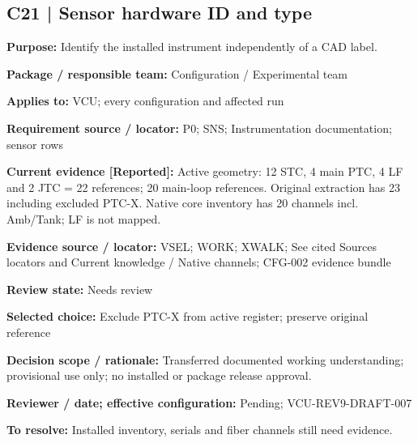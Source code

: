 \documentclass[11pt]{article}
\begin{document}
\par\noindent\begin{minipage}{\textwidth}\small\setlength{\parskip}{2pt}
\subsection*{C21 | Sensor hardware ID and type}
\textbf{Purpose:} Identify the installed instrument independently of a CAD label.\par
\textbf{Package / responsible team:} Configuration / Experimental team\par
\textbf{Applies to:} VCU; every configuration and affected run\par
\textbf{Requirement source / locator:} P0; SNS; Instrumentation documentation; sensor rows\par
\textbf{Current evidence [Reported]:} Active geometry: 12 STC, 4 main PTC, 4 LF and 2 JTC = 22 references; 20 main-loop references. Original extraction has 23 including excluded PTC-X. Native core inventory has 20 channels incl. Amb/Tank; LF is not mapped.\par
\textbf{Evidence source / locator:} VSEL; WORK; XWALK; See cited Sources locators and Current knowledge / Native channels; CFG-002 evidence bundle\par
\textbf{Review state:} Needs review\par
\textbf{Selected choice:} Exclude PTC-X from active register; preserve original reference\par
\textbf{Decision scope / rationale:} Transferred documented working understanding; provisional use only; no installed or package release approval.\par
\textbf{Reviewer / date; effective configuration:} Pending; VCU-REV9-DRAFT-007\par
\textbf{To resolve:} Installed inventory, serials and fiber channels still need evidence.\par
\end{minipage}\par\vspace{5pt}
\end{document}
